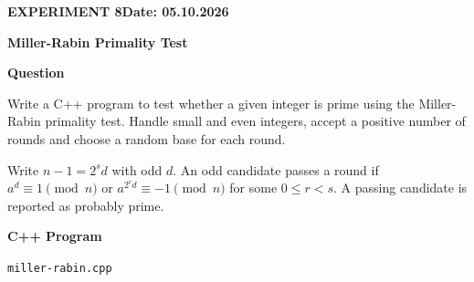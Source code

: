 \documentclass[11pt,a4paper]{article}
\newcommand{\blocktitle}[1]{\Needspace{6\baselineskip}\par\textbf{#1}\par}
\begin{document}
\clearpage
{}\label{exp:miller-rabin}
{\small\bfseries EXPERIMENT 8\hfill Date: 05.10.2026\par}
{\Large\bfseries Miller-Rabin Primality Test\par}
\vspace{2mm}
\blocktitle{Question}
Write a C++ program to test whether a given integer is prime using the Miller-Rabin primality test. Handle small and even integers, accept a positive number of rounds and choose a random base for each round.

Write $n-1=2^s d$ with odd $d$. An odd candidate passes a round if $a^d\equiv1\pmod n$ or $a^{2^r d}\equiv-1\pmod n$ for some $0\leq r<s$. A passing candidate is reported as probably prime.

\blocktitle{C++ Program}
{\small\texttt{miller-rabin.cpp}\par}
\end{document}
